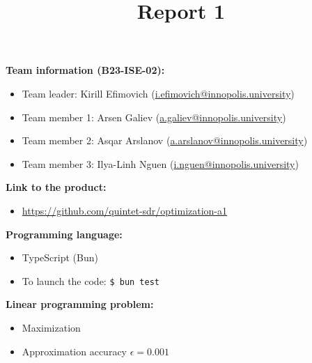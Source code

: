 \documentclass{article}
\title{\textbf{Report 1}}
\author{}
\date{}
\begin{document}
\maketitle

\thispagestyle{fancy}

\textbf{Team information (B23-ISE-02):}
\begin{itemize}[label=-]
    \item Team leader: Kirill Efimovich (\href{mailto:k.efimovich@innopolis.university}{i.efimovich@innopolis.university})
    \item Team member 1: Arsen Galiev (\href{mailto:a.galiev@innopolis.university}{a.galiev@innopolis.university})
    \item Team member 2: Asqar Arslanov (\href{mailto:a.arslanov@innopolis.university}{a.arslanov@innopolis.university})
    \item Team member 3: Ilya-Linh Nguen (\href{mailto:i.nguen@innopolis.university}{i.nguen@innopolis.university})
\end{itemize}

\textbf{Link to the product:}
\begin{itemize}[label=-]
    \item \url{https://github.com/quintet-sdr/optimization-a1}
\end{itemize}

\textbf{Programming language:}
\begin{itemize}[label=-]
    \item TypeScript (Bun)
    \item To launch the code: \texttt{\$ bun test}
\end{itemize}

\textbf{Linear programming problem:}
\begin{itemize}[label=-]
    \item Maximization
    \item Approximation accuracy \(\epsilon = 0.001\)
\end{itemize}
\end{document}
